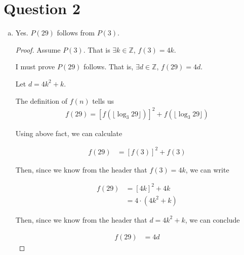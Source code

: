 \documentclass[12pt]{article}
\begin{document}
\section*{Question 2}
\begin{enumerate}[a.]
    \item

    \bigskip

    Yes. $P(29)$ follows from $P(3)$.

    \bigskip

    \begin{proof}

    Assume $P(3)$. That is $\exists k \in \mathbb{Z}$, $f(3) = 4k$.

    \bigskip

    I must prove $P(29)$ follows. That is, $\exists d \in \mathbb{Z}$,
    $f(29) = 4d$.

    \bigskip

    Let $d = 4k^2 + k$.

    \bigskip

    The definition of $f(n)$ tells us
    \setcounter{equation}{0}
    \begin{align}
        f(29) = [f(\lfloor \log_3 29 \rfloor)]^2 + f(\lfloor \log_3 29 \rfloor)
    \end{align}

    \bigskip

    Using above fact, we can calculate

    \begin{align}
        f(29) &= [f(3)]^2 + f(3)
    \end{align}

    \bigskip

    Then, since we know from the header that $f(3) = 4k$, we can write

    \begin{align}
        f(29) &= [4k]^2 + 4k\\
        &= 4 \cdot ( 4k^2 + k )
    \end{align}

    Then, since we know from the header that $d = 4k^2 + k$, we can conclude

    \begin{align}
        f(29) &= 4d
    \end{align}

    \end{proof}



\end{enumerate}
\end{document}
